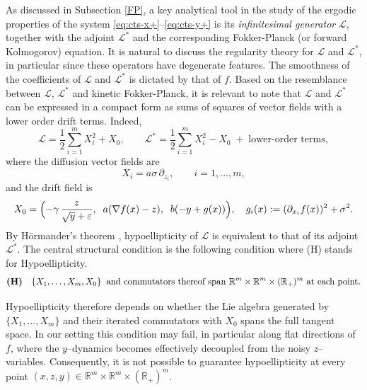 \documentclass[11pt, a4paper,leqno]{amsart}
\theoremstyle{definition}
\numberwithin{equation}{section}
\begin{document}
As discussed in Subsection \ref{FP}, a key analytical tool in the study of the ergodic properties of the system
\eqref{eq:cts-x+}–\eqref{eq:cts-y+} is its \emph{infinitesimal generator}
${\mathcal{L}}$, together with the adjoint ${\mathcal{L}}^{\!*}$ and the corresponding
Fokker-Planck (or forward Kolmogorov) equation. It is natural to discuss the regularity theory for ${\mathcal{L}}$ and ${\mathcal{L}}^\ast$, in particular since
these operators have degenerate features.  The smoothness of the coefficients of ${\mathcal{L}}$ and ${\mathcal{L}}^{\!*}$ is dictated by that of $f$. Based on the resemblance between ${\mathcal{L}}$, ${\mathcal{L}}^\ast$ and kinetic Fokker-Planck, it is relevant to note that ${\mathcal{L}}$ and ${\mathcal{L}}^\ast$ can be expressed in a compact form as sums of squares of vector fields with a lower order drift terms. Indeed,
\[
{\mathcal{L}} = \frac{1}{2}\sum_{i=1}^m X_i^2+X_0,
\qquad
{\mathcal{L}}^{\!*}=   \frac{1}{2}\sum_{i=1}^m X_i^2 -X_0\; + \; \text{lower-order terms} ,
\]
where the diffusion vector fields are
\[
X_i = a\sigma\,\partial_{z_i}, \qquad i=1,\dots,m,
\]
and the drift field is
\[
X_0= \Bigl(-\gamma\,\frac{z}{\sqrt{y}+\varepsilon},\;\; a(\nabla f(x)-z),\;\; b(-y+g(x))\Bigr),
\quad
g_i(x):=(\partial_{x_i}f(x))^2+\sigma^2.
\]
By Hörmander’s theorem \cite{Hormander1967}, hypoellipticity of ${\mathcal{L}}$ is equivalent to that of its adjoint ${\mathcal{L}}^\ast$. The central structural condition is the following condition where (H) stands for Hypoellipticity.
\[
\mbox{\textbf{(H)}}\quad\{X_1,\dots,X_m,X_0\} \;\;\text{and  commutators thereof span $\mathbb{R}^m\times\mathbb{R}^m\times(\mathbb{R}_+)^m$ at each point.}
\]


Hypoellipticity therefore depends on whether the Lie algebra generated by
$\{X_1,\dots,X_m\}$ and their iterated commutators with $X_0$ spans the full
tangent space. In our setting this condition may fail, in particular along
flat directions of $f$, where the $y$–dynamics becomes effectively decoupled
from the noisy $z$–variables. Consequently, it is not possible to guarantee
hypoellipticity at every point $(x,z,y)\in\mathbb{R}^m\times\mathbb{R}^m\times
(\mathbb{R}_+)^m$.
\end{document}
